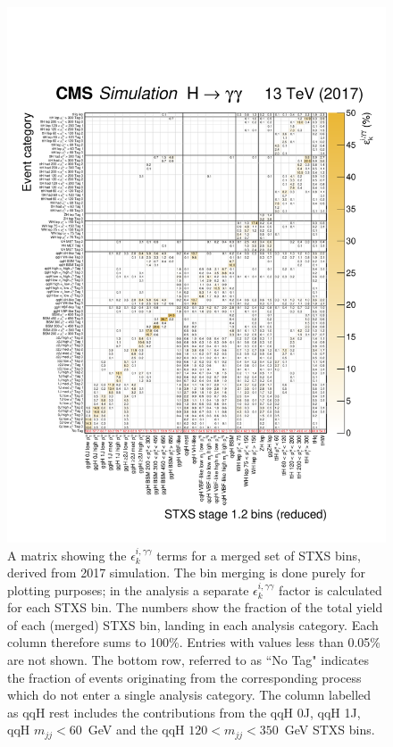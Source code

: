 \begin{figure}[hptb]
  \centering
  \includegraphics[width=1\textwidth]{Figures/app_matrices/migrationMatrix_2017_thesis.pdf}
  \caption[Efficiency times acceptance matrix from 2017 simulation]
  {
    A matrix showing the $\epsilon^{i,\gamma\gamma}_{k}$ terms for a merged set of STXS bins, derived from 2017 simulation. The bin merging is done purely for plotting purposes; in the analysis a separate $\epsilon^{i,\gamma\gamma}_{k}$ factor is calculated for each STXS bin. The numbers show the fraction of the total yield of each (merged) STXS bin, landing in each analysis category. Each column therefore sums to 100\%. Entries with values less than 0.05\% are not shown. The bottom row, referred to as ``No Tag" indicates the fraction of events originating from the corresponding process which do not enter a single analysis category. The column labelled as qqH rest includes the contributions from the qqH 0J, qqH 1J, qqH $m_{jj}<60$~GeV and the qqH $120<m_{jj}<350$~GeV STXS bins.
  }
  \label{fig:ea_2017}
\end{figure}

